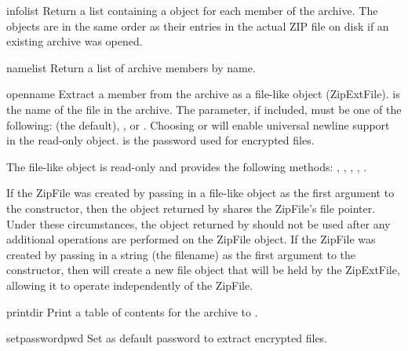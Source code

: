\begin{methoddesc}{infolist}{}
  Return a list containing a  object for each member of
  the archive.  The objects are in the same order as their entries in
  the actual ZIP file on disk if an existing archive was opened.
\end{methoddesc}

\begin{methoddesc}{namelist}{}
  Return a list of archive members by name.
\end{methoddesc}

\begin{methoddesc}{open}{name}
    Extract a member from the archive as a file-like object (ZipExtFile).
     is the name of the file in the archive. The 
    parameter, if included, must be one of the following:  (the 
    default), , or . Choosing  or 
     will enable universal newline support in the read-only
    object.  is the password used for encrypted files.
    \begin{notice}
        The file-like object is read-only and provides the following methods:
        , , ,
        , . 
    \end{notice}
    \begin{notice}
        If the ZipFile was created by passing in a file-like object as the 
        first argument to the constructor, then the object returned by
         shares the ZipFile's file pointer.  Under these 
        circumstances, the object returned by  should not 
        be used after any additional operations are performed on the 
        ZipFile object.  If the ZipFile was created by passing in a string
        (the filename) as the first argument to the constructor, then 
         will create a new file object that will be held
        by the ZipExtFile, allowing it to operate independently of the 
        ZipFile.
    \end{notice}
\end{methoddesc}

\begin{methoddesc}{printdir}{}
  Print a table of contents for the archive to .
\end{methoddesc}

\begin{methoddesc}{setpassword}{pwd}
  Set  as default password to extract encrypted files.
\end{methoddesc}

